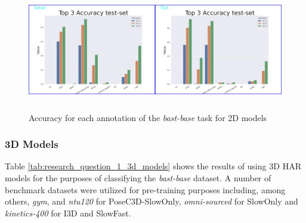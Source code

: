 \documentclass[extern,palatino]{cgMA}
\begin{document}
\begin{figure}[h]
\center
\includegraphics[height={150pt}, width={430pt}]{Thesis/images/tsm_tanet_acc_per_class.jpg}
\caption{Accuracy for each annotation of the \textit{bast-base} task for 2D models}
\label{fig:tsm_tanet_topk_accuracy}
\end{figure}


\subsubsection{3D Models}

Table \ref{tab:research_question_1_3d_models} shows the results of using 3D HAR models for the purposes of classifying the \textit{bast-base} dataset. A number of benchmark datasets were utilized for pre-training purposes including, among others, \textit{gym}, and \textit{ntu120} for PoseC3D-SlowOnly, \textit{omni-sourced} for SlowOnly and \textit{kinetics-400} for I3D and SlowFast.
\end{document}
